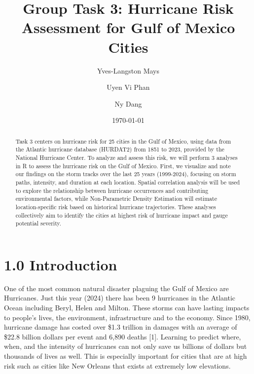 \documentclass[12pt,letterpaper]{article}
\begin{document}
\title{Group Task 3: Hurricane Risk Assessment for Gulf of Mexico
Cities}

\author{Yves-Langston Mays}
\author{Uyen Vi Phan}
\author{Ny Dang}

\date{\today}
\maketitle

\begin{abstract}
Task 3 centers on hurricane risk for 25 cities in the Gulf of Mexico,
using data from the Atlantic hurricane database (HURDAT2) from 1851 to
2023, provided by the National Hurricane Center. To analyze and assess
this risk, we will perform 3 analyses in R to assess the hurricane risk
on the Gulf of Mexico. First, we visualize and note our findings on the
storm tracks over the last 25 years (1999-2024), focusing on storm
paths, intensity, and duration at each location. Spatial correlation
analysis will be used to explore the relationship between hurricane
occurrences and contributing environmental factors, while Non-Parametric
Density Estimation will estimate location-specific risk based on
historical hurricane trajectories. These analyses collectively aim to
identify the cities at highest risk of hurricane impact and gauge
potential severity.
\end{abstract}

\tableofcontents
\newpage

\section{1.0 Introduction}\label{introduction}

One of the most common natural disaster plaguing the Gulf of Mexico are
Hurricanes. Just this year (2024) there has been 9 hurricanes in the
Atlantic Ocean including Beryl, Helen and Milton. These storms can have
lasting impacts to people's lives, the environment, infrastructure and
to the economy. Since 1980, hurricane damage has costed over \$1.3
trillion in damages with an average of \$22.8 billion dollars per event
and 6,890 deaths {[}1{]}. Learning to predict where, when, and the
intensity of hurricanes can not only save us billions of dollars but
thousands of lives as well. This is especially important for cities that
are at high risk such as cities like New Orleans that exists at
extremely low elevations.
\end{document}
